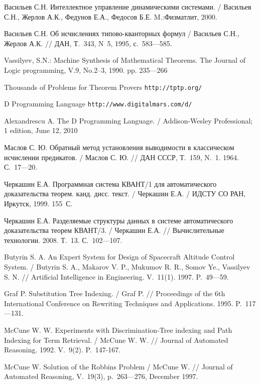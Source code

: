 \begin{thebibliography}{99}

%
%


 Васильев С.Н. Интеллектное управление динамическими системами. / Васильев С.Н., Жерлов А.К., Федунов Е.А., Федосов Б.Е.  M.:Физматлит, 2000.

 Васильев С.Н. Об исчислениях типово-кванторных формул / Васильев С.Н., Жерлов А.К.  // ДАН, Т.~343, N~5, 1995, с.~583---585.

 Vassilyev, S.N.: Machine Synthesis of Mathematical Theorems. The Journal of Logic programming, V.9, No.2--3, 1990. pp. 235---266

 Thousands of Problems for Theorem Provers {\tt http://tptp.org/}

 D Programming Language {\tt http://www.digitalmars.com/d/}

 Alexandrescu A. The D Programming Language. / Addison-Wesley Professional; 1 edition, June 12, 2010

 Маслов С. Ю. Обратный метод установления выводимости в классическом исчислении предикатов. / Маслов С. Ю. // ДАН СССР, Т.~159, N.~1. 1964. С.~17---20.

 Черкашин Е.А. Программная система КВАНТ/1 для автоматического доказательства теорем. канд. дисс. текст. / Черкашин Е.А. / ИДСТУ СО РАН, Иркутск, 1999. 155~С.

 Черкашин Е.А. Разделяемые структуры данных в системе автоматического доказательства теорем КВАНТ/3. / Черкашин Е.А. // Вычислительные технологии. 2008. Т.~13. С.~102---107.

 Butyrin S. A. An {E}xpert {S}ystem for {D}esign of {S}pacecraft  {A}ltitude {C}ontrol {S}ystem. / Butyrin S. A., Makarov V. P., Mukumov R. R., Somov Ye., Vassilyev S. N. // Artificial Intelligence in Engineering. V.~11(1). 1997. P.~49---59.

 Graf P. Substitution Tree Indexing. / Graf P. // Proceedings of the 6th International Conference on Rewriting Techniques and Applications. 1995. P.~117---131.

 McCune W. W. Experiments with Discrimination-Tree indexing and Path Indexing for Term Retrieval. / McCune W. W. // Journal of Automated Reasoning. 1992. V.~9(2). P.~147-167.

 McCune W. Solution of the Robbins Problem / McCune W. // Journal of Automated Reasoning, V.~19(3), p.~263---276, December 1997.


\end{thebibliography}
